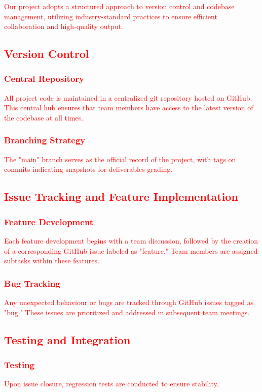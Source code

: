\documentclass{article}
\begin{document}
\textcolor{red}{Our project adopts a structured approach to version control 
and codebase management, utilizing industry-standard practices to ensure 
efficient collaboration and high-quality output.}

\subsection{\textcolor{red}{Version Control}}
\subsubsection{\textcolor{red}{Central Repository}}
  \textcolor{red}{All project code is maintained in a centralized git repository 
  hosted on GitHub. This central hub ensures that team members have access to the 
  latest version of the codebase at all times.}
\subsubsection{\textcolor{red}{Branching Strategy}}
  \textcolor{red}{The "main" branch serves as the official record of the project, 
  with tags on commits indicating snapshots for deliverables grading.}

\subsection{\textcolor{red}{Issue Tracking and Feature Implementation}}
\subsubsection{\textcolor{red}{Feature Development}}
  \textcolor{red}{Each feature development begins with a team discussion, 
  followed by the creation of a corresponding GitHub issue labeled as "feature." 
  Team members are assigned subtasks within these features.}
\subsubsection{\textcolor{red}{Bug Tracking}}
  \textcolor{red}{Any unexpected behaviour or bugs are tracked through GitHub issues 
  tagged as "bug." These issues are prioritized and addressed in subsequent team 
  meetings.}

\subsection{\textcolor{red}{Testing and Integration}}
\subsubsection{\textcolor{red}{Testing}}
  \textcolor{red}{Upon issue closure, regression tests are conducted to ensure 
  stability.}
\end{document}

